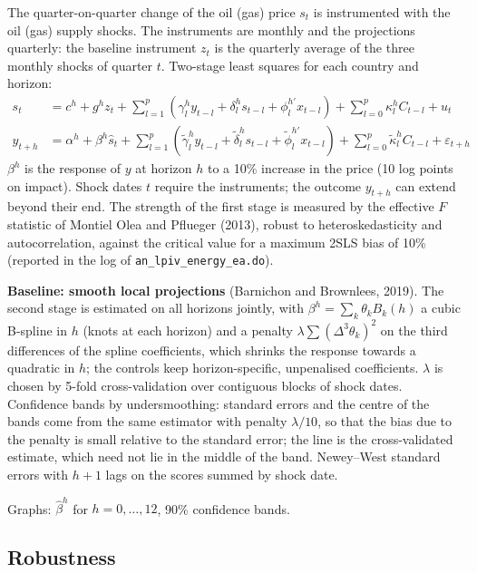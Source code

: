 \documentclass[11pt,a4paper]{article}
\begin{document}
\noindent The quarter-on-quarter change of the oil (gas) price $s_t$ is instrumented with
the oil (gas) supply shocks. The instruments are monthly and the projections quarterly:
the baseline instrument $z_t$ is the quarterly average of the three monthly shocks of
quarter $t$. Two-stage least squares for each country and horizon:
\begin{align}
s_{t} &= c^h + g^h z_{t}
 + \sum_{l=1}^{p} \left( \gamma_l^h y_{t-l} + \delta_l^h s_{t-l} + \phi_l^{h\prime} x_{t-l} \right)
 + \sum_{l=0}^{p} \kappa_l^h C_{t-l} + u_{t} \\
y_{t+h} &= \alpha^h + \beta^h \hat s_{t}
 + \sum_{l=1}^{p} \left( \tilde\gamma_l^h y_{t-l} + \tilde\delta_l^h s_{t-l} + \tilde\phi_l^{h\prime} x_{t-l} \right)
 + \sum_{l=0}^{p} \tilde\kappa_l^h C_{t-l} + \varepsilon_{t+h}
\end{align}
$\beta^h$ is the response of $y$ at horizon $h$ to a 10\% increase in the price (10 log
points on impact). Shock dates $t$ require the instruments; the
outcome $y_{t+h}$ can extend beyond their end. The strength of the first stage is
measured by the effective $F$ statistic of Montiel Olea and Pflueger (2013), robust
to heteroskedasticity and autocorrelation, against the critical value for a maximum
2SLS bias of 10\% (reported in the log of \texttt{an\_lpiv\_energy\_ea.do}).

\noindent \textbf{Baseline: smooth local projections} (Barnichon and Brownlees, 2019). The
second stage is estimated on all horizons jointly, with $\beta^h = \sum_k \theta_k B_k(h)$ a
cubic B-spline in $h$ (knots at each horizon) and a penalty $\lambda \sum (\Delta^3 \theta_k)^2$
on the third differences of the spline coefficients, which shrinks the response towards a
quadratic in $h$; the controls keep horizon-specific, unpenalised coefficients. $\lambda$ is
chosen by 5-fold cross-validation over contiguous blocks of shock dates. Confidence bands
by undersmoothing: standard errors and the centre of the bands come from the same
estimator with penalty $\lambda/10$, so that the bias due to the penalty is small relative
to the standard error; the line is the cross-validated estimate, which need not lie in the
middle of the band. Newey--West standard errors with $h+1$ lags on the scores summed by
shock date.

\noindent Graphs: $\hat\beta^h$ for $h=0,\dots,12$, 90\% confidence bands.

\subsection{Robustness}
\end{document}

